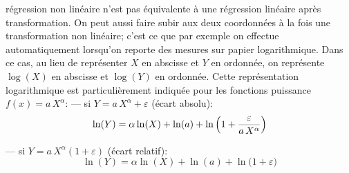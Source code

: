r\'egression non lin\'eaire n'est pas \'equivalente \`a une r\'egression
lin\'eaire apr\`es transformation. 
\medskip 
On peut aussi faire subir aux deux coordonn\'ees \`a la fois une 
transformation non lin\'eaire; c'est ce que par exemple on effectue 
automatiquement lorsqu'on reporte des mesures sur papier 
logarithmique. Dans ce cas, au lieu de repr\'esenter $X$ en abscisse et 
$Y$ en ordonn\'ee,  on repr\'esente $\log (X)$ en abscisse et $\log (Y)$ en 
ordonn\'ee.  Cette repr\'esentation logarithmique est particuli\`erement 
indiqu\'ee pour les fonctions puissance $f(x) = a\, X^\alpha$: 
\medskip 
--- si $Y = a\, X^\alpha + \varepsilon$ (\'ecart absolu): 
$$\ln (Y) = \alpha\ln (X) + \ln (a) + \ln\Big(1 + {\varepsilon\over a\, 
X^\alpha}\Big)$$ 
 
--- si $Y = a\, X^\alpha (1+ \varepsilon )$ (\'ecart relatif): 
$$\ln (Y) = \alpha\ln (X) + \ln (a) + \ln\Big(1 + \varepsilon\Big)$$ 
 
